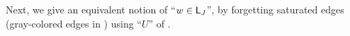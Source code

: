 
Next, we give an equivalent notion of ``$\word \in \const{L}_{\graph[3]}$'',
by forgetting saturated edges (gray-colored edges in ) using ``$U$'' of .
